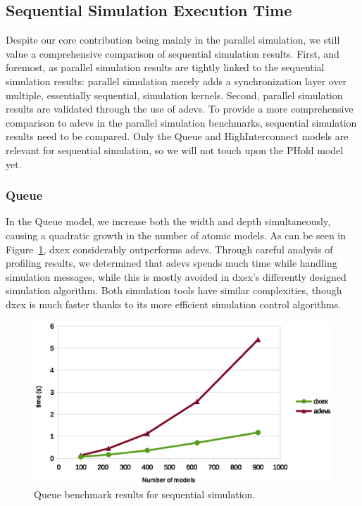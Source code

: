 \subsection{Sequential Simulation Execution Time}
Despite our core contribution being mainly in the parallel simulation, we still value a comprehensive comparison of sequential simulation results.
First, and foremost, as parallel simulation results are tightly linked to the sequential simulation results: parallel simulation merely adds a synchronization layer over multiple, essentially sequential, simulation kernels.
Second, parallel simulation results are validated through the use of adevs.
To provide a more comprehensive comparison to adevs in the parallel simulation benchmarks, sequential simulation results need to be compared.
Only the Queue and HighInterconnect models are relevant for sequential simulation, so we will not touch upon the PHold model yet.

\subsubsection{Queue}
In the Queue model, we increase both the width and depth simultaneously, causing a quadratic growth in the number of atomic models.
As can be seen in Figure~\ref{fig:Queue_benchmark}, dxex considerably outperforms adevs.
Through careful analysis of profiling results, we determined that adevs spends much time while handling simulation messages, while this is mostly avoided in dxex's differently designed simulation algorithm.
Both simulation tools have similar complexities, though dxex is much faster thanks to its more efficient simulation control algorithms.

\begin{figure}
	\includegraphics[width=\columnwidth]{fig/queue_sequential.eps}
	\caption{Queue benchmark results for sequential simulation.}
	\label{fig:Queue_benchmark}
\end{figure}

